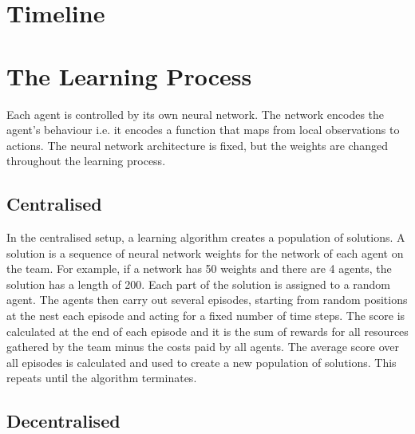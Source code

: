 \documentclass[12pt]{article}
\begin{document}
\section{Timeline} \label{timeline}






\appendix

\section{The Learning Process}\label{learning}

Each agent is controlled by its own neural network. 
The network encodes the agent’s behaviour i.e. it encodes a function that maps from local observations to actions. 
The neural network architecture is fixed, but the weights are changed throughout the learning process.\\

\subsection{Centralised}

In the centralised setup, a learning algorithm creates a population of solutions. 
A solution is a sequence of neural network weights for the network of each agent on the team. 
For example, if a network has 50 weights and there are 4 agents, the solution has a length of 200. 
Each part of the solution is assigned to a random agent. 
The agents then carry out several episodes, starting from random positions at the nest each episode and acting for a fixed number of time steps. 
The score is calculated at the end of each episode and it is the sum of rewards for all resources gathered by the team minus the costs paid by all agents. 
The average score over all episodes is calculated and used to create a new population of solutions. 
This repeats until the algorithm terminates.\\

\subsection{Decentralised}
\end{document}
